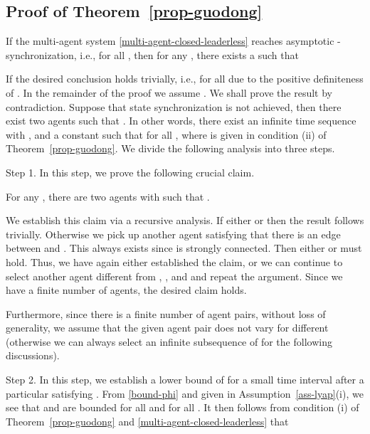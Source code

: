 \documentclass[a4paper, 11pt]{article}
\begin{document}
\subsection{Proof of Theorem~\ref{prop-guodong}}\label{proof-prop-guodong}
If the multi-agent system \eqref{multi-agent-closed-leaderless}
reaches  asymptotic -synchronization, i.e.,
  for all , then for any , there exists a  such that


If  the desired conclusion holds trivially, i.e.,  for all 
due to the positive definiteness of .
In the remainder of the proof we assume . We shall prove the result by contradiction. Suppose that state synchronization is not achieved, then there exist two agents  such that .
In other words, there exist an infinite time sequence  with , and a constant  such that  for all , where  is given in condition (ii) of Theorem~\ref{prop-guodong}. We divide the following analysis into three steps.

\vspace{2mm}

\noindent Step 1. In this step, we prove the following crucial claim.

\vspace{1mm}

 For any , there are two agents  with  such that .

We establish this claim via a recursive analysis. If either  or   then the result follows trivially. Otherwise we pick up another agent  satisfying that there is an edge between  and . This  always exists since  is strongly connected. Then either  or  must hold. Thus, we have again either established the claim, or we can continue to select another agent different from , , and  and repeat the argument. Since we have a finite number of agents, the desired claim holds.

Furthermore, since there is a finite number of agent pairs, without loss of generality, we assume that the given agent pair  does not vary for different  (otherwise we can always select an infinite subsequence of  for the following discussions).

\vspace{2mm}

\noindent Step 2. In this step, we establish a lower bound of  for a small time interval after a particular  satisfying .
From \eqref{bound-phi} and  given in Assumption~\ref{ass-lyap}(i),
we see that  and  are bounded for all  and for all .
It then follows from condition (i) of Theorem~\ref{prop-guodong} and \eqref{multi-agent-closed-leaderless} that
\end{document}
